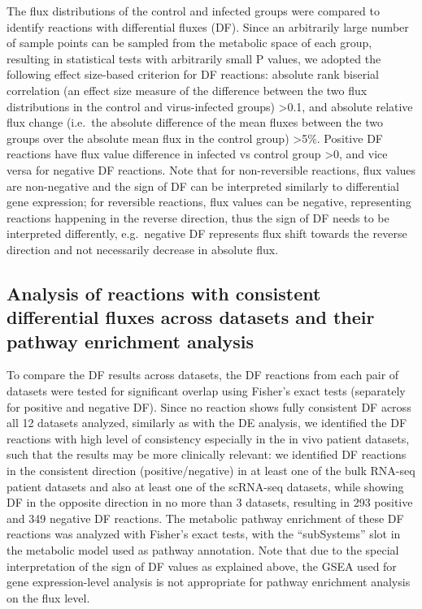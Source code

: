 \documentclass[12pt,twoside,openany,\mydriver]{thesis}  %
\begin{document}
The flux distributions of the control and infected groups were compared to identify reactions with differential fluxes (DF). Since an arbitrarily large number of sample points can be sampled from the metabolic space of each group, resulting in statistical tests with arbitrarily small P values, we adopted the following effect size-based criterion for DF reactions: absolute rank biserial correlation (an effect size measure of the difference between the two flux distributions in the control and virus-infected groups) \textgreater{}0.1, and absolute relative flux change (i.e.~the absolute difference of the mean fluxes between the two groups over the absolute mean flux in the control group) \textgreater{}5\%. Positive DF reactions have flux value difference in infected vs control group \textgreater{}0, and vice versa for negative DF reactions. Note that for non-reversible reactions, flux values are non-negative and the sign of DF can be interpreted similarly to differential gene expression; for reversible reactions, flux values can be negative, representing reactions happening in the reverse direction, thus the sign of DF needs to be interpreted differently, e.g.~negative DF represents flux shift towards the reverse direction and not necessarily decrease in absolute flux.

\hypertarget{analysis-of-reactions-with-consistent-differential-fluxes-across-datasets-and-their-pathway-enrichment-analysis}{%
\subsection{Analysis of reactions with consistent differential fluxes across datasets and their pathway enrichment analysis}\label{analysis-of-reactions-with-consistent-differential-fluxes-across-datasets-and-their-pathway-enrichment-analysis}}

To compare the DF results across datasets, the DF reactions from each pair of datasets were tested for significant overlap using Fisher's exact tests (separately for positive and negative DF). Since no reaction shows fully consistent DF across all 12 datasets analyzed, similarly as with the DE analysis, we identified the DF reactions with high level of consistency especially in the in vivo patient datasets, such that the results may be more clinically relevant: we identified DF reactions in the consistent direction (positive/negative) in at least one of the bulk RNA-seq patient datasets and also at least one of the scRNA-seq datasets, while showing DF in the opposite direction in no more than 3 datasets, resulting in 293 positive and 349 negative DF reactions. The metabolic pathway enrichment of these DF reactions was analyzed with Fisher's exact tests, with the ``subSystems'' slot in the metabolic model used as pathway annotation. Note that due to the special interpretation of the sign of DF values as explained above, the GSEA used for gene expression-level analysis is not appropriate for pathway enrichment analysis on the flux level.
\end{document}
